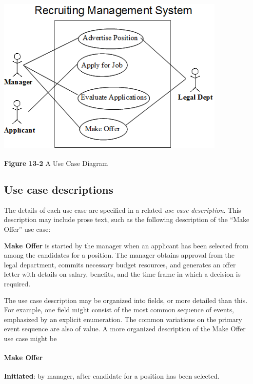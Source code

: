 \begin{center}
\includegraphics[width=4.5in,height=3.15in]{ub-img/usecase2.png}

{\sffamily\bfseries Figure 13-2}
{\sffamily A Use Case Diagram}
\end{center}

\subsection{Use case descriptions}

The details of each use case are specified in a related \textit{use case
description}. This description may include prose text, such as the
following description of the ``Make Offer'' use case:

\textbf{Make Offer} is started by the manager when an applicant has been
selected from among the candidates for a position. The manager obtains
approval from the legal department, commits necessary budget resources,
and generates an offer letter with details on salary, benefits, and the
time frame in which a decision is required.

The use case description may be organized into fields, or more
detailed than this. For example, one field might consist of the
most common sequence of events, emphasized by an explicit enumeration.
The common variations on the primary event sequence are also of
value. A more organized description of the Make Offer use case might
be

\paragraph[Make Offer]{\bfseries Make Offer}
\textbf{Initiated}: by manager, after candidate for a position has been
selected.

